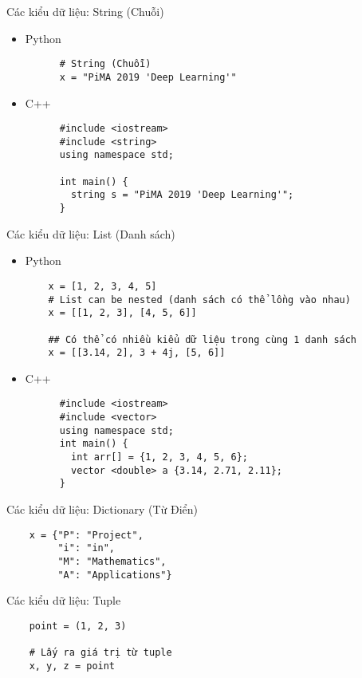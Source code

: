 \documentclass[10pt]{beamer}
\begin{document}
\begin{frame}[fragile]{Các kiểu dữ liệu: String (Chuỗi)}
  \begin{itemize}
    \item Python
    \begin{verbatim}
      # String (Chuỗi)
      x = "PiMA 2019 'Deep Learning'"
    \end{verbatim}

    \item C++
    \begin{verbatim}
      #include <iostream>
      #include <string>
      using namespace std;

      int main() {
        string s = "PiMA 2019 'Deep Learning'";
      }
    \end{verbatim}
  \end{itemize}

\end{frame}


\begin{frame}[fragile]{Các kiểu dữ liệu: List (Danh sách)}

  \begin{itemize}
    \item Python
    \begin{verbatim}
    x = [1, 2, 3, 4, 5]
    # List can be nested (danh sách có thể lồng vào nhau)
    x = [[1, 2, 3], [4, 5, 6]]

    ## Có thể có nhiều kiểu dữ liệu trong cùng 1 danh sách
    x = [[3.14, 2], 3 + 4j, [5, 6]]
    \end{verbatim}
    \item C++
    \begin{verbatim}
      #include <iostream>
      #include <vector>
      using namespace std;
      int main() {
        int arr[] = {1, 2, 3, 4, 5, 6};
        vector <double> a {3.14, 2.71, 2.11};
      }
    \end{verbatim}
  \end{itemize}
\end{frame}

\begin{frame}[fragile]{Các kiểu dữ liệu: Dictionary (Từ Điển)}
  \begin{verbatim}
    x = {"P": "Project",
         "i": "in",
         "M": "Mathematics",
         "A": "Applications"}
  \end{verbatim}
\end{frame}

\begin{frame}[fragile]{Các kiểu dữ liệu: Tuple}
  \begin{verbatim}
    point = (1, 2, 3)

    # Lấy ra giá trị từ tuple
    x, y, z = point
  \end{verbatim}


\end{frame}
\end{document}
